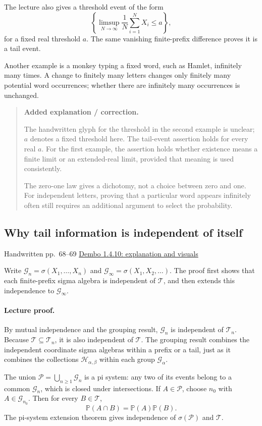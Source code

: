 \documentclass[11pt,letterpaper]{article}
\newcommand{\lecturesection}[1]{\subsection{#1}}
\begin{document}
The lecture also gives a threshold event of the form \[\left\{\limsup_{N\to\infty}\frac1N\sum_{i=1}^N X_i\le a\right\},\] for a fixed real threshold $a$. The same vanishing finite-prefix difference proves it is a tail event.

Another example is a monkey typing a fixed word, such as Hamlet, infinitely many times. A change to finitely many letters changes only finitely many potential word occurrences; whether there are infinitely many occurrences is unchanged.

\begin{quote}\small\textbf{Added explanation / correction.}

The handwritten glyph for the threshold in the second example is unclear; $a$ denotes a fixed threshold here. The tail-event assertion holds for every real $a$. For the first example, the assertion holds whether existence means a finite limit or an extended-real limit, provided that meaning is used consistently.

The zero-one law gives a dichotomy, not a choice between zero and one. For independent letters, proving that a particular word appears infinitely often still requires an additional argument to select the probability.
\end{quote}

\hypertarget{l8-s3}{}
\lecturesection{Why tail information is independent of itself}
{\small\textcolor{lectureink}{Handwritten pp.\ 68--69} \quad \href{https://josephrbailey.com/probability/\#entry-1-4-10}{Dembo 1.4.10: explanation and visuals}}

Write $\mathcal G_n=\sigma(X_1,\ldots,X_n)$ and $\mathcal G_\infty=\sigma(X_1,X_2,\ldots)$. The proof first shows that each finite-prefix sigma algebra is independent of $\mathcal T$, and then extends this independence to $\mathcal G_\infty$.

\paragraph{Lecture proof.}
By mutual independence and the grouping result, $\mathcal G_n$ is independent of $\mathcal T_n$. Because $\mathcal T\subseteq\mathcal T_n$, it is also independent of $\mathcal T$. The grouping result combines the independent coordinate sigma algebras within a prefix or a tail, just as it combines the collections $\mathcal H_{\alpha,\beta}$ within each group $\mathcal G_\alpha$.

The union $\mathcal P=\bigcup_{n\ge1}\mathcal G_n$ is a pi system: any two of its events belong to a common $\mathcal G_n$, which is closed under intersections. If $A\in\mathcal P$, choose $n_0$ with $A\in\mathcal G_{n_0}$. Then for every $B\in\mathcal T$, \[\mathbb P(A\cap B)=\mathbb P(A)\mathbb P(B).\] The pi-system extension theorem gives independence of $\sigma(\mathcal P)$ and $\mathcal T$.
\end{document}
